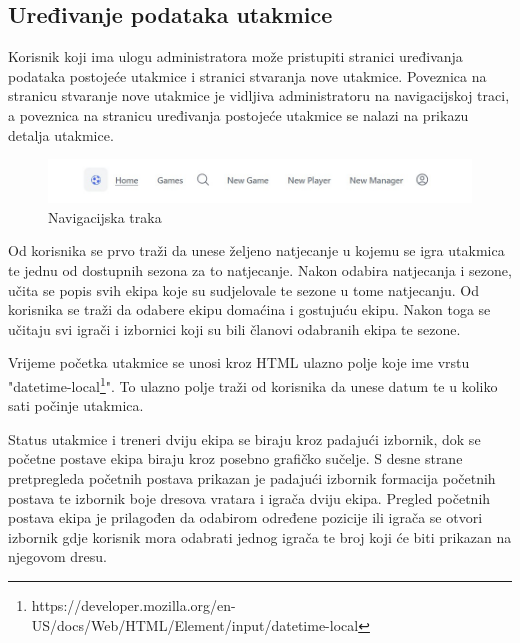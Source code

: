 \documentclass[times, utf8, zavrsni]{fer}
\begin{document}
\subsection{Uređivanje podataka utakmice}

Korisnik koji ima ulogu administratora može pristupiti stranici uređivanja podataka postojeće utakmice i stranici stvaranja nove utakmice.
Poveznica na stranicu stvaranje nove utakmice je vidljiva administratoru na navigacijskoj traci, a poveznica na stranicu uređivanja postojeće utakmice se nalazi na prikazu detalja utakmice.

\begin{figure}[htb]
\centering
\includegraphics[width=14cm]{images/navigation.jpg}
\caption{Navigacijska traka}
\label{fig:formation}
\end{figure}


Od korisnika se prvo traži da unese željeno natjecanje u kojemu se igra utakmica te jednu od dostupnih sezona za to natjecanje.
Nakon odabira natjecanja i sezone, učita se popis svih ekipa koje su sudjelovale te sezone u tome natjecanju.
Od korisnika se traži da odabere ekipu domaćina i gostujuću ekipu. Nakon toga se učitaju svi igrači i izbornici koji su bili članovi odabranih ekipa te sezone.

Vrijeme početka utakmice se unosi kroz HTML ulazno polje koje ime vrstu "datetime-local\footnote{https://developer.mozilla.org/en-US/docs/Web/HTML/Element/input/datetime-local}".
To ulazno polje traži od korisnika da unese datum te u koliko sati počinje utakmica.

Status utakmice i treneri dviju ekipa se biraju kroz padajući izbornik, dok se početne postave ekipa biraju kroz posebno grafičko sučelje.
S desne strane pretpregleda početnih postava prikazan je padajući izbornik formacija početnih postava te izbornik boje dresova vratara i igrača dviju ekipa.
Pregled početnih postava ekipa je prilagođen da odabirom određene pozicije ili igrača se otvori izbornik gdje korisnik mora odabrati jednog igrača te broj koji će biti prikazan na njegovom dresu.
\end{document}
